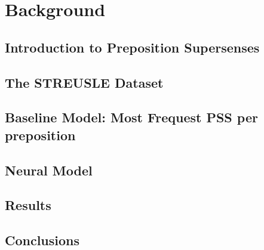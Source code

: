 
\chapter{Background} %

\label{ChapterX} %


\section{Introduction to Preposition Supersenses}

\section{The STREUSLE Dataset}

\section{Baseline Model: Most Frequest PSS per preposition}

\section{Neural Model}

\section{Results}

\section{Conclusions}

